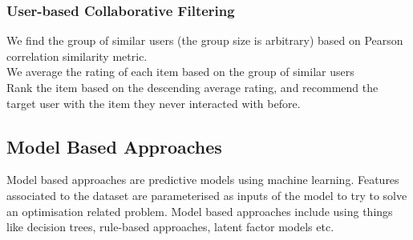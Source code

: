 \subsubsection{User-based Collaborative Filtering}
We find the group of similar users (the group size is arbitrary) based on Pearson correlation similarity metric.
\\We average the rating of each item based on the group of similar users
\\Rank the item based on the descending average rating, and recommend the target user with the item they never interacted with before.


\subsection{Model Based Approaches}
Model based approaches are predictive models using machine learning. Features associated to the dataset are parameterised as inputs of the model to try to solve an optimisation related problem. 
Model based approaches include using things like decision trees, rule-based approaches, latent factor models etc.
